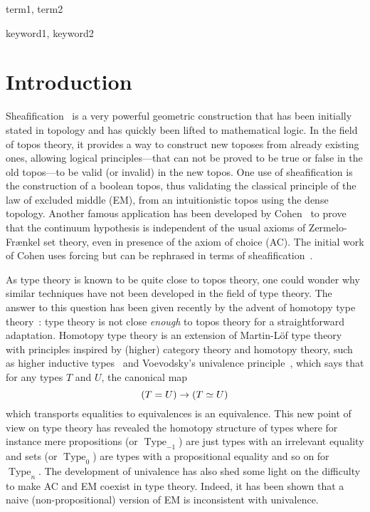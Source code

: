 \documentclass[preprint,9pt,numbers]{sigplanconf}
\DeclareMathOperator{\Type}{Type}
\newenvironment{mymath}[1][-0em]{%
  \newcommand\mymathaux{\vspace{#1}}%
  \vspace{#1}%
  \begin{equation*}%
  }{ %
    \mymathaux%
  \end{equation*}}
\begin{document}
\terms
term1, term2

\keywords
keyword1, keyword2

\section{Introduction}
\label{sec:intro}

Sheafification~\cite{maclanemoerdijk} is a very powerful geometric
construction that has been initially stated in topology and has
quickly been lifted to mathematical logic.
%
In the field of topos theory, it provides a way to construct new toposes
from already existing ones, allowing logical principles---that can not
be proved to be true or false in the old topos---to be valid (or
invalid) in the new topos.
%
One use of sheafification is the construction of a boolean
topos, thus validating the classical principle of the law of excluded
middle (EM), from an intuitionistic topos using the dense topology. 
%
Another famous application has been developed by
Cohen~\cite{cohen1966} to prove that the continuum hypothesis is
independent of the usual axioms of Zermelo-Fr\ae nkel set theory, even
in presence of the axiom of choice (AC). The initial work of Cohen
uses forcing but can be rephrased in terms of
sheafification~\cite{maclanemoerdijk}.

As type theory is known to be quite close to topos theory,
one could wonder why similar techniques have not been developed in the
field of type theory. 
%
The answer to this question has been given recently by the advent of
homotopy type theory~\cite{hottbook}: type theory is not close {\em
  enough} to topos theory for a straightforward adaptation. 
%
Homotopy type theory is an extension of
Martin-Löf type theory with principles inspired by (higher) category
theory and homotopy theory, such as higher inductive
types~\cite{lumsdaine2011higher,lumsdaine2013higher} and
Voevodsky's univalence principle~\cite{kapulkin2012simplicial}, which
says that for any types $T$ and $U$, the canonical map 
\begin{mymath}
(T = U) \to (T \simeq U)
\end{mymath}%
%
which transports equalities to equivalences is an equivalence.
%
This new point of view on type theory has revealed the homotopy
structure of types where for instance mere propositions (or
$\Type_{-1}$) are just types with an
irrelevant equality and sets (or $\Type_{0}$) are types
with a propositional equality and so on for $\Type_{n}$.
%
The development of univalence has also shed some light on the
difficulty to make AC and EM coexist in type theory. Indeed, it
has been shown that a naive (non-propositional) version of EM is
inconsistent with univalence.
\end{document}
